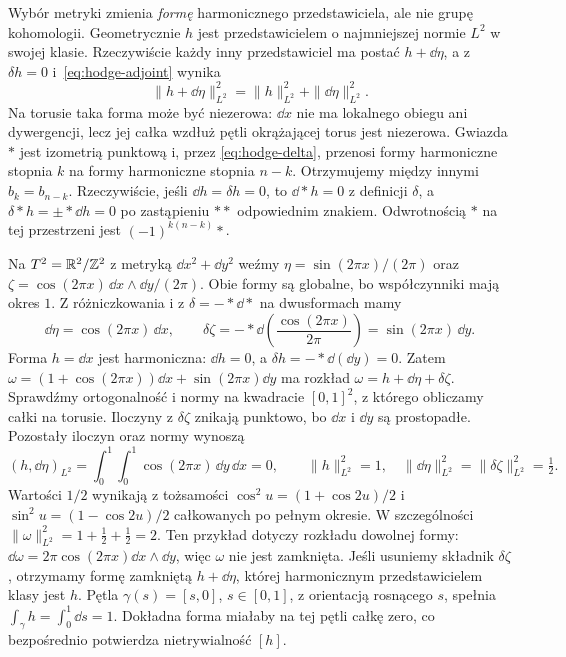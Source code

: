 Wybór metryki zmienia \emph{formę} harmonicznego
przedstawiciela, ale nie grupę kohomologii.
Geometrycznie $h$ jest przedstawicielem o najmniejszej
normie $L^2$ w swojej klasie. Rzeczywiście każdy inny
przedstawiciel ma postać $h+\dd\eta$, a z
$\delta h=0$ i~\eqref{eq:hodge-adjoint} wynika
\[
 \|h+\dd\eta\|_{L^2}^2
 =\|h\|_{L^2}^2+\|\dd\eta\|_{L^2}^2.
\]
Na torusie taka forma może być niezerowa: $\dd x$
nie ma lokalnego obiegu ani dywergencji, lecz jej całka
wzdłuż pętli okrążającej torus jest niezerowa.
Gwiazda $*$ jest izometrią punktową i, przez
\eqref{eq:hodge-delta}, przenosi formy harmoniczne
stopnia $k$ na formy harmoniczne stopnia $n-k$.
Otrzymujemy między innymi $b_k=b_{n-k}$.
Rzeczywiście, jeśli $\dd h=\delta h=0$, to
$\dd*h=0$ z definicji $\delta$, a
$\delta*h=\pm*\dd h=0$ po zastąpieniu $**$ odpowiednim znakiem.
Odwrotnością $*$ na tej przestrzeni jest
$(-1)^{k(n-k)}*$.

\begin{przyklad}
\label{prz:hodge-rozklad-torus-18}
Na $T^2=\mathbb{R}^2/\mathbb{Z}^2$ z metryką $\dd x^2+\dd y^2$ weźmy
$\eta=\sin(2\pi x)/(2\pi)$ oraz
$\zeta=\cos(2\pi x)\,\dd x\wedge\dd y/(2\pi)$.
Obie formy są globalne, bo współczynniki mają okres $1$.
Z różniczkowania i z $\delta=-*\dd*$ na dwusformach mamy
\[
 \dd\eta=\cos(2\pi x)\,\dd x,\qquad
 \delta\zeta=-*\dd\!\left(\frac{\cos(2\pi x)}{2\pi}\right)
            =\sin(2\pi x)\,\dd y.
\]
Forma $h=\dd x$ jest harmoniczna: $\dd h=0$, a
$\delta h=-*\dd(\dd y)=0$.
Zatem
$\omega=(1+\cos(2\pi x))\dd x+\sin(2\pi x)\dd y$
ma rozkład $\omega=h+\dd\eta+\delta\zeta$.
Sprawdźmy ortogonalność i normy na kwadracie
$[0,1]^2$, z którego obliczamy całki na torusie.
Iloczyny z $\delta\zeta$ znikają punktowo,
bo $\dd x$ i $\dd y$ są prostopadłe.
Pozostały iloczyn oraz normy wynoszą
\[
 (h,\dd\eta)_{L^2}
 =\int_0^1\int_0^1\cos(2\pi x)\,\dd y\,\dd x=0,\qquad
 \|h\|_{L^2}^2=1,\quad
 \|\dd\eta\|_{L^2}^2=\|\delta\zeta\|_{L^2}^2=\tfrac12.
\]
Wartości $1/2$ wynikają z tożsamości
$\cos^2 u=(1+\cos2u)/2$ i $\sin^2u=(1-\cos2u)/2$
całkowanych po pełnym okresie.
W szczególności $\|\omega\|_{L^2}^2=1+\frac12+\frac12=2$.
Ten przykład dotyczy rozkładu dowolnej formy:
$\dd\omega=2\pi\cos(2\pi x)\dd x\wedge\dd y$,
więc $\omega$ nie jest zamknięta.
Jeśli usuniemy składnik $\delta\zeta$, otrzymamy formę zamkniętą
$h+\dd\eta$, której harmonicznym przedstawicielem klasy jest $h$.
Pętla $\gamma(s)=[s,0]$, $s\in[0,1]$, z orientacją rosnącego $s$,
spełnia $\int_\gamma h=\int_0^1\dd s=1$.
Dokładna forma miałaby na tej pętli całkę zero,
co bezpośrednio potwierdza nietrywialność $[h]$.
\end{przyklad}

